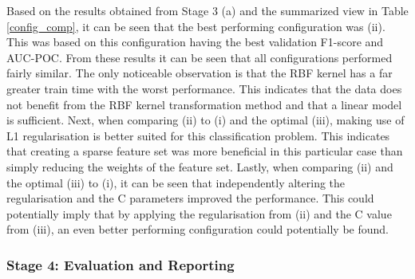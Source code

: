Based on the results obtained from Stage 3 (a) and the summarized view in Table \ref{config_comp}, it can be seen that the best performing configuration was (ii). This was based
on this configuration having the best validation F1-score and AUC-POC. From these results it can be seen that all configurations performed fairly similar. The only noticeable observation
is that the RBF kernel has a far greater train time with the worst performance. This indicates that the data does not benefit from the RBF kernel transformation method and that a linear
model is sufficient. Next, when comparing (ii) to (i) and the optimal (iii), making use of L1 regularisation is better suited for this classification problem. This indicates that creating
a sparse feature set was more beneficial in this particular case than simply reducing the weights of the feature set. Lastly, when comparing (ii) and the optimal (iii) to (i), it can be 
seen that independently altering the regularisation and the C parameters improved the performance. This could potentially imply that by applying the regularisation from (ii) and the 
C value from (iii), an even better performing configuration could potentially be found.

\newpage 

\subsubsection{Stage 4: Evaluation and Reporting}

